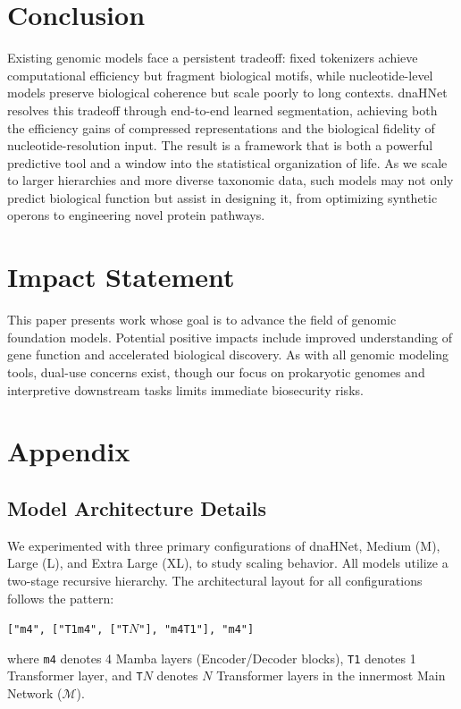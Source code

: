\documentclass{article}
\theoremstyle{plain}
\theoremstyle{definition}
\theoremstyle{remark}
\begin{document}
\section{Conclusion}
Existing genomic models face a persistent tradeoff: fixed tokenizers achieve computational efficiency but fragment biological motifs, while nucleotide-level models preserve biological coherence but scale poorly to long contexts. dnaHNet resolves this tradeoff through end-to-end learned segmentation, achieving both the efficiency gains of compressed representations and the biological fidelity of nucleotide-resolution input. The result is a framework that is both a powerful predictive tool and a window into the statistical organization of life. As we scale to larger hierarchies and more diverse taxonomic data, such models may not only predict biological function but assist in designing it, from optimizing synthetic operons to engineering novel protein pathways.

\section*{Impact Statement}
This paper presents work whose goal is to advance the field of genomic foundation models. Potential positive impacts include improved understanding of gene function and accelerated biological discovery. As with all genomic modeling tools, dual-use concerns exist, though our focus on prokaryotic genomes and interpretive downstream tasks limits immediate biosecurity risks.




\newpage
\appendix
\onecolumn
\section{Appendix}
\label{sec:appendix}

\subsection{Model Architecture Details}
\label{app:architecture}

We experimented with three primary configurations of dnaHNet, Medium (M), Large (L), and Extra Large (XL), to study scaling behavior. All models utilize a two-stage recursive hierarchy. The architectural layout for all configurations follows the pattern:
\begin{center}
    \texttt{["m4", ["T1m4", ["T$N$"], "m4T1"], "m4"]}
\end{center}
where \texttt{m4} denotes 4 Mamba layers (Encoder/Decoder blocks), \texttt{T1} denotes 1 Transformer layer, and \texttt{T$N$} denotes $N$ Transformer layers in the innermost Main Network ($\mathcal{M}$).
\end{document}
